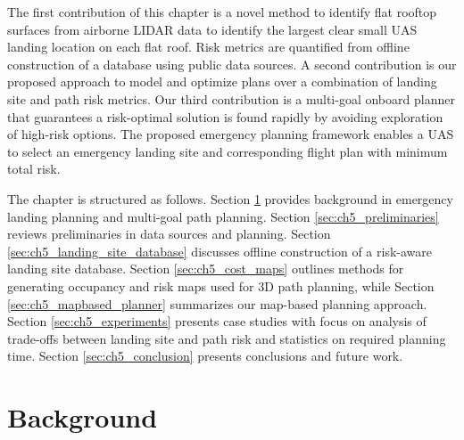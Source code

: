 The first contribution of this chapter is a novel method to identify flat rooftop surfaces from airborne LIDAR data to identify the largest clear small \ac{UAS} landing location on each flat roof. Risk metrics are quantified from offline construction of a database using public data sources. A second contribution is our proposed approach to model and optimize plans over a combination of landing site and path risk metrics.  Our third contribution is a multi-goal onboard planner that guarantees a risk-optimal solution is found rapidly by avoiding exploration of high-risk options. The proposed emergency planning framework enables a \ac{UAS} to select an emergency landing site and  corresponding flight plan with minimum total risk.

The chapter is structured as follows. Section \ref{sec:ch5_background} provides background in emergency landing planning and multi-goal path planning.  Section \ref{sec:ch5_preliminaries} reviews preliminaries in data sources and planning. Section \ref{sec:ch5_landing_site_database} discusses offline construction of a risk-aware landing site database. Section \ref{sec:ch5_cost_maps} outlines methods for generating occupancy and risk maps used for 3D path planning, while Section \ref{sec:ch5_mapbased_planner} summarizes our map-based planning approach. Section \ref{sec:ch5_experiments} presents case studies with focus on analysis of trade-offs between landing site and path risk and statistics on required planning time.  Section \ref{sec:ch5_conclusion} presents conclusions and future work.

\section{Background}\label{sec:ch5_background}

